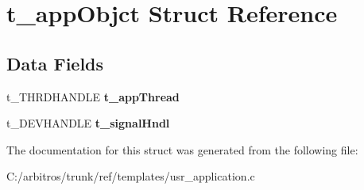 \hypertarget{structt__app_objct}{\section{t\-\_\-app\-Objct Struct Reference}
\label{structt__app_objct}
}
\subsection*{Data Fields}
\begin{DoxyCompactItemize}
\item 
\hypertarget{structt__app_objct_ac1f154c6a601465e05ee93a6ebeb5203}{t\-\_\-\-T\-H\-R\-D\-H\-A\-N\-D\-L\-E {\bfseries t\-\_\-app\-Thread}}\label{structt__app_objct_ac1f154c6a601465e05ee93a6ebeb5203}

\item 
\hypertarget{structt__app_objct_ab14ef713ed09485609e3ddc0a485824b}{t\-\_\-\-D\-E\-V\-H\-A\-N\-D\-L\-E {\bfseries t\-\_\-signal\-Hndl}}\label{structt__app_objct_ab14ef713ed09485609e3ddc0a485824b}

\end{DoxyCompactItemize}


The documentation for this struct was generated from the following file\-:\begin{DoxyCompactItemize}
\item 
C\-:/arbitros/trunk/ref/templates/usr\-\_\-application.\-c\end{DoxyCompactItemize}
